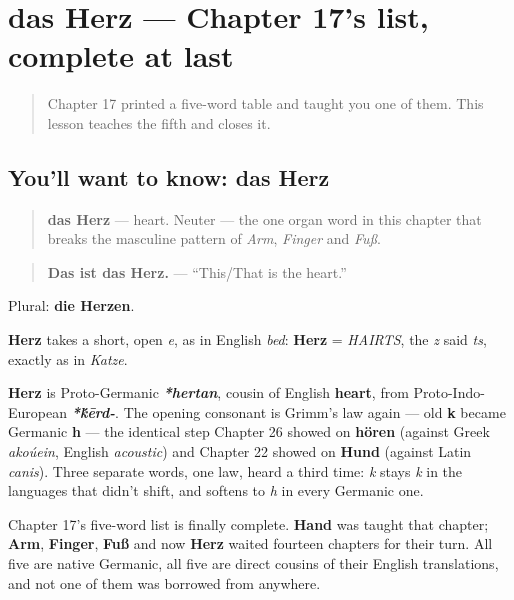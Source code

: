 \section[das Herz]{das Herz — Chapter 17's list, complete at last}

\label{lesson:GE-C31-herz}



\begin{quote}
Chapter 17 printed a five-word table and taught you one of them. This lesson teaches the fifth and closes it.
\end{quote}

\subsection*{You'll want to know: das Herz}
\begin{quote}
\textbf{das Herz} — heart. Neuter — the one organ word in this chapter that breaks the masculine pattern of \emph{Arm}, \emph{Finger} and \emph{Fuß}.
\end{quote}

\begin{quote}
\textbf{Das ist das Herz.} — \textquotedblleft{}This/That is the heart.\textquotedblright{}
\end{quote}

Plural: \textbf{die Herzen}.

\begin{sounds}
\textbf{Herz} takes a short, open \emph{e}, as in English \emph{bed}: \textbf{Herz} = \emph{HAIRTS}, the \emph{z} said \emph{ts}, exactly as in \emph{Katze}.
\end{sounds}

\begin{cousinweb}
\textbf{Herz} is Proto-Germanic \emph{\textbf{*hertan}}, cousin of English \textbf{heart}, from Proto-Indo-European \emph{\textbf{*\'{k}ērd-}}. The opening consonant is Grimm's law again — old \textbf{k} became Germanic \textbf{h} — the identical step Chapter 26 showed on \textbf{hören} (against Greek \emph{akoúein}, English \emph{acoustic}) and Chapter 22 showed on \textbf{Hund} (against Latin \emph{canis}). Three separate words, one law, heard a third time: \emph{k} stays \emph{k} in the languages that didn't shift, and softens to \emph{h} in every Germanic one.

Chapter 17's five-word list is finally complete. \textbf{Hand} was taught that chapter; \textbf{Arm}, \textbf{Finger}, \textbf{Fuß} and now \textbf{Herz} waited fourteen chapters for their turn. All five are native Germanic, all five are direct cousins of their English translations, and not one of them was borrowed from anywhere.
\end{cousinweb}

